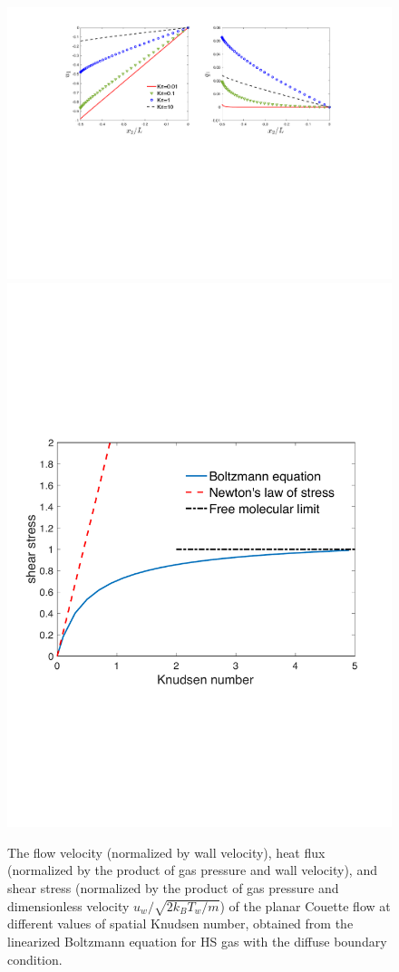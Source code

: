 \begin{figure}[t]
	\centering
	\includegraphics[scale=0.7]{Introduction/IMG/Couette_Route_NonEquilibrium2.pdf}\\
	\includegraphics[scale=0.4]{Introduction/IMG/shearStress_Couette2.pdf}
	\caption{
		The flow velocity (normalized by wall velocity), heat flux (normalized by the product of gas pressure and wall velocity), and shear stress (normalized by the product of gas pressure and dimensionless velocity $u_w/\sqrt{2k_BT_w/m}$)  of the planar Couette flow at different values of spatial Knudsen number, obtained from the linearized Boltzmann equation for HS gas with the diffuse boundary condition.}
	\label{Kn_region_couette}
\end{figure}


